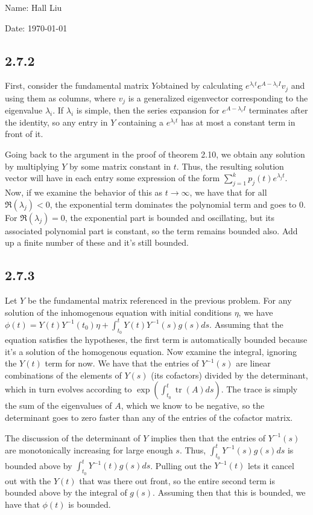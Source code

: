 \documentclass{article}
\DeclareMathOperator{\tr}{tr}
\begin{document}
Name: Hall Liu

Date: \today 
\vspace{1.5cm}

\subsection*{2.7.2}
First, consider the fundamental matrix $Y$obtained by calculating $e^{\lambda_it}e^{A-\lambda_iI}v_j$ and using them as columns, where $v_j$ is a generalized eigenvector corresponding to the eigenvalue $\lambda_i$. If $\lambda_i$ is simple, then the series expansion for $e^{A-\lambda_iI}$ terminates after the identity, so any entry in $Y$ containing a $e^{\lambda_it}$ has at most a constant term in front of it.

Going back to the argument in the proof of theorem 2.10, we obtain any solution by multiplying $Y$ by some matrix constant in $t$. Thus, the resulting solution vector will have in each entry some expression of the form $\sum_{j=1}^kp_j(t)e^{\lambda_jt}$. Now, if we examine the behavior of this as $t\to\infty$, we have that for all $\Re(\lambda_j)<0$, the exponential term dominates the polynomial term and goes to $0$. For $\Re(\lambda_j)=0$, the exponential part is bounded and oscillating, but its associated polynomial part is constant, so the term remains bounded also. Add up a finite number of these and it's still bounded. 
\subsection*{2.7.3}
Let $Y$ be the fundamental matrix referenced in the previous problem. For any solution of the inhomogenous equation with initial conditions $\eta$, we have $\phi(t)=Y(t)Y^{-1}(t_0)\eta+\int_{t_0}^tY(t)Y^{-1}(s)g(s)ds$. Assuming that the equation satisfies the hypotheses, the first term is automatically bounded because it's a solution of the homogenous equation. Now examine the integral, ignoring the $Y(t)$ term for now. We have that the entries of $Y^{-1}(s)$ are linear combinations of the elements of $Y(s)$ (its cofactors) divided by the determinant, which in turn evolves according to $\exp\left(\int_{t_0}^t\tr(A) ds\right)$. The trace is simply the sum of the eigenvalues of $A$, which we know to be negative, so the determinant goes to zero faster than any of the entries of the cofactor matrix. 

The discussion of the determinant of $Y$ implies then that the entries of $Y^{-1}(s)$ are monotonically increasing for large enough $s$. Thus, $\int_{t_0}^tY^{-1}(s)g(s)ds$ is bounded above by $\int_{t_0}^tY^{-1}(t)g(s)ds$. Pulling out the $Y^{-1}(t)$ lets it cancel out with the $Y(t)$ that was there out front, so the entire second term is bounded above by the integral of $g(s)$. Assuming then that this is bounded, we have that $\phi(t)$ is bounded.
\end{document}
